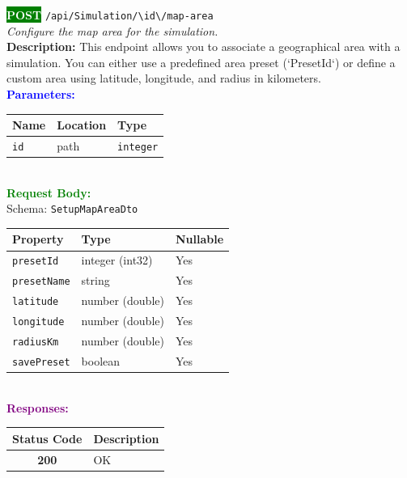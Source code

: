 \begin{tcolorbox}[
    colback=green!5,
    colframe=green,
    arc=2mm,
    boxrule=1pt,
    left=5pt,
    right=5pt,
    top=5pt,
    bottom=5pt
]
\noindent\colorbox{green}{\textcolor{white}{\textbf{POST}}} 
\texttt{\large /api/Simulation/\textbackslash{}{id\textbackslash{}}/map-area}\\[0.3em]
\textit{Configure the map area for the simulation.}\\[0.3em]
\textbf{Description:} This endpoint allows you to associate a geographical area with a simulation.
You can either use a predefined area preset (`PresetId`) or define a custom area
using latitude, longitude, and radius in kilometers.\\[0.5em]
\vspace{0.3em}
\textbf{\textcolor{blue}{Parameters:}}\\[0.2em]
\begin{tabular}{|l|l|l|}
\hline
\rowcolor{gray!20}
\textbf{Name} & \textbf{Location} & \textbf{Type} \\ \hline
\texttt{id} & path & \texttt{integer} \\ \hline
\end{tabular}\\[0.5em]
\vspace{0.3em}
\textbf{\textcolor{green}{Request Body:}}\\[0.2em]
Schema: \texttt{SetupMapAreaDto}\\[0.3em]
\begin{tabular}{|l|l|l|}
\hline
\rowcolor{green!10}
\textbf{Property} & \textbf{Type} & \textbf{Nullable} \\ \hline
\texttt{presetId} & integer (int32) & Yes \\ \hline
\rowcolor{gray!5}
\texttt{presetName} & string & Yes \\ \hline
\texttt{latitude} & number (double) & Yes \\ \hline
\rowcolor{gray!5}
\texttt{longitude} & number (double) & Yes \\ \hline
\texttt{radiusKm} & number (double) & Yes \\ \hline
\rowcolor{gray!5}
\texttt{savePreset} & boolean & Yes \\ \hline
\end{tabular}\\[0.5em]
\vspace{0.3em}
\textbf{\textcolor{purple}{Responses:}}\\[0.2em]
\begin{tabular}{|c|p{10cm}|}
\hline
\rowcolor{gray!20}
\textbf{Status Code} & \textbf{Description} \\ \hline
\colorbox{green!20}{\textbf{200}} & OK \\ \hline
\end{tabular}
\end{tcolorbox}
\vspace{0.5em}

